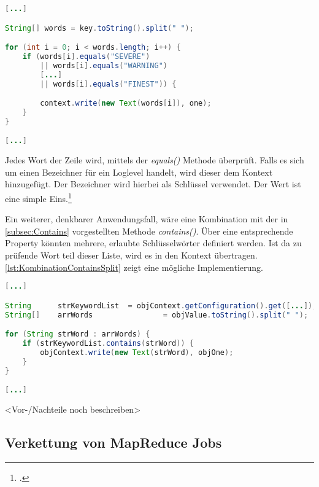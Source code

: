 \begin{lstlisting}[language=Java,caption=Auszug der \textit{map()} Methode der Klasse \textit{LogMapper}, title=\autoref*{lst:LogMapper}: Auszug der \textit{map()} Methode der Klasse \textit{LogMapper}\protect\footnotemark,label=lst:LogMapper]
[...]

String[] words = key.toString().split(" ");

for (int i = 0; i < words.length; i++) {
	if (words[i].equals("SEVERE")
		|| words[i].equals("WARNING")
		[...]
		|| words[i].equals("FINEST")) {

		context.write(new Text(words[i]), one);
	}
}

[...]
\end{lstlisting}

Jedes Wort der Zeile wird, mittels der \textit{equals()} Methode überprüft. Falls es sich um einen Bezeichner für ein Loglevel handelt, wird dieser dem Kontext hinzugefügt. Der Bezeichner wird hierbei als Schlüssel verwendet. Der Wert ist eine simple Eins.\footcite[Vgl.][S. 121 f.]{Freiknecht.2014}

Ein weiterer, denkbarer Anwendungsfall, wäre eine Kombination mit der in \autoref{subsec:Contains} vorgestellten Methode \textit{contains()}. Über eine entsprechende Property könnten mehrere, erlaubte Schlüsselwörter definiert werden. Ist da zu prüfende Wort teil dieser Liste, wird es in den Kontext übertragen. \autoref{lst:KombinationContainsSplit} zeigt eine mögliche Implementierung. \\

\begin{lstlisting}[language=Java,caption=Kombination von \textit{contains()} und \textit{split()},label=lst:KombinationContainsSplit]
[...]

String		strKeywordList	= objContext.getConfiguration().get([...]);
String[]	arrWords 				= objValue.toString().split(" ");

for (String strWord : arrWords) {
	if (strKeywordList.contains(strWord)) {
		objContext.write(new Text(strWord), objOne);
	}
}

[...]
\end{lstlisting}

<Vor-/Nachteile noch beschreiben>

\subsection{Verkettung von MapReduce Jobs}


